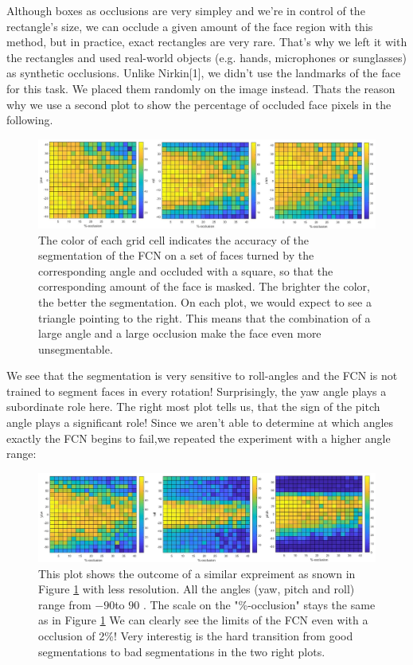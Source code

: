 Although boxes as occlusions are very simpley and we're in control of the rectangle's size, we can occlude a given amount of the face region with this method, but in practice, exact rectangles are very rare. That's why we left it with the rectangles and used real-world objects (e.g. hands, microphones or sunglasses) as synthetic occlusions. Unlike Nirkin[1], we didn't use the landmarks of the face for this task. We placed them randomly on the image instead. Thats the reason why we use a second plot to show the percentage of occluded face pixels in the following.

\begin{figure}[h]
	\centering
	\includegraphics[width=\textwidth]{Figures/occVal_angles.png}
	\caption{The color of each grid cell indicates the accuracy of the segmentation of the FCN on a set of faces turned by the corresponding angle and occluded with a square, so that the corresponding amount of the face is masked. The brighter the color, the better the segmentation. On each plot, we would expect to see a triangle pointing to the right. This means that the combination of a large angle and a large occlusion make the face even more unsegmentable.}
	\label{fig:occVal40}
\end{figure}
We see that the segmentation is very sensitive to roll-angles and the FCN is not trained to segment faces in every rotation! Surprisingly, the yaw angle plays a subordinate role here. The right most plot tells us, that the sign of the pitch angle plays a significant role! Since we aren't able to determine at which angles exactly the FCN begins to fail,we repeated the experiment with a higher angle range:\\

\begin{figure}[h!]
	\centering
	\includegraphics[width=\textwidth]{Figures/occVal_angles_90.png}
	\caption{This plot shows the outcome of a similar expreiment as snown in Figure \ref{fig:occVal40} with less resolution. All the angles (yaw, pitch and roll) range from $-90$\textdegree to $90$ \textdegree. The scale on the "\%-occlusion" stays the same as in Figure \ref{fig:occVal40} We can clearly see the limits of the FCN even with a occlusion of 2\%! Very interestig is the hard transition from good segmentations to bad segmentations in the two right plots.}
	\label{fig:occVal90}
\end{figure}

